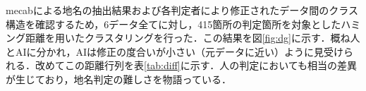 mecabによる地名の抽出結果および各判定者により修正されたデータ間のクラス構造を確認するため，6データ全てに対し，415箇所の判定箇所を対象としたハミング距離を用いたクラスタリングを行った．この結果を図\ref{fig:dg}に示す．概ね人とAIに分かれ，AIは修正の度合いが小さい（元データに近い）ように見受けられる．改めてこの距離行列を表\ref{tab:diff}に示す．人の判定においても相当の差異が生じており，地名判定の難しさを物語っている．
